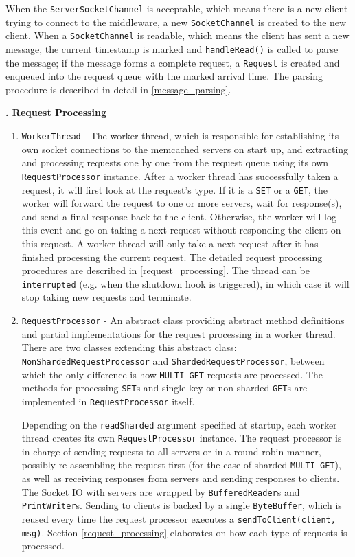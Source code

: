 \begin{enumerate}[noitemsep,topsep=0pt]
When the \texttt{ServerSocketChannel} is acceptable, which means there is a new client trying to connect to the middleware, a new \texttt{SocketChannel} is created to the new client. When a \texttt{SocketChannel} is readable, which means the client has sent a new message, the current timestamp is marked and \texttt{handleRead()} is called to parse the message; if the message forms a complete request, a \texttt{Request} is created and enqueued into the request queue with the marked arrival time. The parsing procedure is described in detail in \ref{message_parsing}.
\end{enumerate}

\noindent\textbf{\uppercase\expandafter{}. Request Processing}

\begin{enumerate}[noitemsep,topsep=0pt]
\item \texttt{WorkerThread} - The worker thread, which is responsible for establishing its own socket connections to the memcached servers on start up, and extracting and processing requests one by one from the request queue using its own \texttt{RequestProcessor} instance. After a worker thread has successfully taken a request, it will first look at the request's type. If it is a \texttt{SET} or a \texttt{GET}, the worker will forward the request to one or more servers, wait for response(s), and send a final response back to the client. Otherwise, the worker will log this event and go on taking a next request without responding the client on this request. A worker thread will only take a next request after it has finished processing the current request. The detailed request processing procedures are described in \ref{request_processing}. The thread can be \texttt{interrupted} (e.g. when the shutdown hook is triggered), in which case it will stop taking new requests and terminate.  

\item \texttt{RequestProcessor} - An abstract class providing abstract method definitions and partial implementations for the request processing in a worker thread. There are two classes extending this abstract class: \texttt{NonShardedRequestProcessor} and \texttt{ShardedRequestProcessor}, between which the only difference is how \texttt{MULTI-GET} requests are processed. The methods for processing \texttt{SET}s and single-key or non-sharded \texttt{GET}s are implemented in \texttt{RequestProcessor} itself. 

Depending on the \texttt{readSharded} argument specified at startup, each worker thread creates its own \texttt{RequestProcessor} instance. The request processor is in charge of sending requests to all servers or in a round-robin manner, possibly re-assembling the request first (for the case of sharded \texttt{MULTI-GET}), as well as receiving responses from servers and sending responses to clients. The Socket IO with servers are wrapped by \texttt{BufferedReader}s and \texttt{PrintWriter}s. Sending to clients is backed by a single \texttt{ByteBuffer}, which is reused every time the request processor executes a \texttt{sendToClient(client, msg)}. Section \ref{request_processing} elaborates on how each type of requests is processed.


\end{enumerate}

